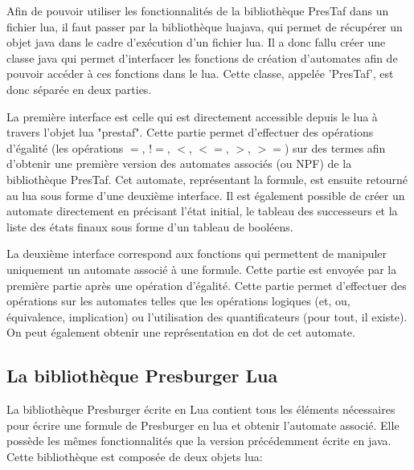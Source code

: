Afin de pouvoir utiliser les fonctionnalités de la bibliothèque PresTaf dans un fichier lua, il faut passer par la bibliothèque luajava, qui permet de récupérer un objet java dans le cadre d'exécution d’un fichier lua. Il a donc fallu créer une classe java qui permet d’interfacer les fonctions de création d’automates afin de pouvoir accéder à ces fonctions dans le lua. Cette classe, appelée 'PresTaf', est donc séparée en deux parties.\\\par 

La première interface est celle qui est directement accessible depuis le lua à travers l’objet lua "prestaf". Cette partie permet d’effectuer des opérations d’égalité (les opérations $=$, $!=$, $<$, $<=$, $>$, $>=$) sur des termes afin d’obtenir une première version des automates associés (ou NPF) de la bibliothèque PresTaf. Cet automate, représentant la formule, est ensuite retourné au lua sous forme d’une deuxième interface. Il est également possible de créer un automate directement en précisant l’état initial, le tableau des successeurs et la liste des états finaux sous forme d’un tableau de booléens.\\\par

La deuxième interface correspond aux fonctions qui permettent de manipuler uniquement un automate associé à une formule. Cette partie est envoyée par la première partie après une opération d’égalité. Cette partie permet d’effectuer des opérations sur les automates telles que les opérations logiques (et, ou, équivalence, implication) ou l’utilisation des quantificateurs (pour tout, il existe). On peut également obtenir une représentation en dot de cet automate.

\subsection{La bibliothèque Presburger Lua}

La bibliothèque Presburger écrite en Lua contient tous les éléments nécessaires pour écrire une formule de Presburger en lua et obtenir l’automate associé. Elle possède les mêmes fonctionnalités que la version précédemment écrite en java. Cette bibliothèque est composée de deux objets lua:

